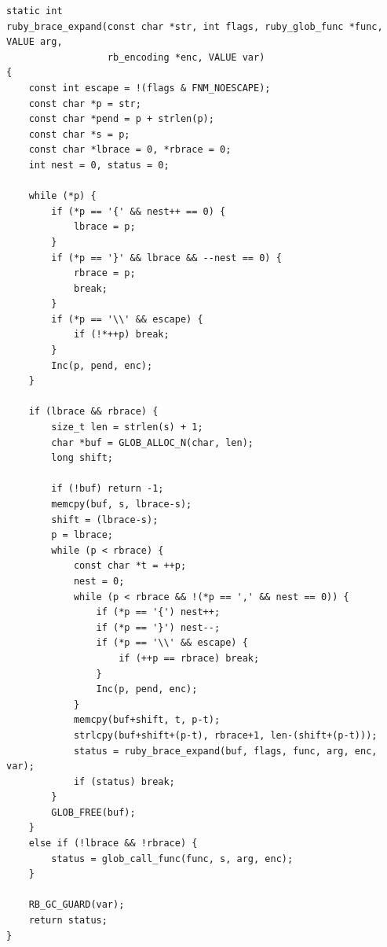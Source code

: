 \begin{lstlisting}[label={lst:ruby_brace_expand_full}]
static int
ruby_brace_expand(const char *str, int flags, ruby_glob_func *func, VALUE arg,
                  rb_encoding *enc, VALUE var)
{
    const int escape = !(flags & FNM_NOESCAPE);
    const char *p = str;
    const char *pend = p + strlen(p);
    const char *s = p;
    const char *lbrace = 0, *rbrace = 0;
    int nest = 0, status = 0;

    while (*p) {
        if (*p == '{' && nest++ == 0) {
            lbrace = p;
        }
        if (*p == '}' && lbrace && --nest == 0) {
            rbrace = p;
            break;
        }
        if (*p == '\\' && escape) {
            if (!*++p) break;
        }
        Inc(p, pend, enc);
    }

    if (lbrace && rbrace) {
        size_t len = strlen(s) + 1;
        char *buf = GLOB_ALLOC_N(char, len);
        long shift;

        if (!buf) return -1;
        memcpy(buf, s, lbrace-s);
        shift = (lbrace-s);
        p = lbrace;
        while (p < rbrace) {
            const char *t = ++p;
            nest = 0;
            while (p < rbrace && !(*p == ',' && nest == 0)) {
                if (*p == '{') nest++;
                if (*p == '}') nest--;
                if (*p == '\\' && escape) {
                    if (++p == rbrace) break;
                }
                Inc(p, pend, enc);
            }
            memcpy(buf+shift, t, p-t);
            strlcpy(buf+shift+(p-t), rbrace+1, len-(shift+(p-t)));
            status = ruby_brace_expand(buf, flags, func, arg, enc, var);
            if (status) break;
        }
        GLOB_FREE(buf);
    }
    else if (!lbrace && !rbrace) {
        status = glob_call_func(func, s, arg, enc);
    }

    RB_GC_GUARD(var);
    return status;
}
\end{lstlisting}
